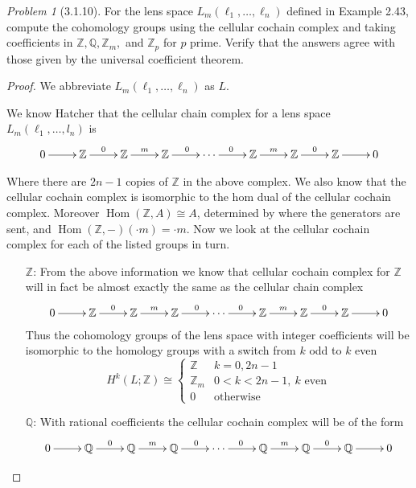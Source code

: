 \documentclass[10pt]{article}
\newcommand{\bb}[1]{\mathbb{#1}}
\DeclareMathOperator{\Hom}{Hom}
\theoremstyle{remark}
\newtheorem{problem}{Problem}
\begin{document}
\begin{problem}[3.1.10]
  For the lens space $L_m(\ell_1,\ldots,\ell_n)$ defined in Example 2.43,
  compute the cohomology groups using the cellular cochain complex
  and taking coefficients in $\bb{Z},\bb{Q},\bb{Z}_m,$ and $\bb{Z}_p$
  for $p$ prime. Verify that the answers agree with those given by the
  universal coefficient theorem.
\end{problem}

\begin{proof}
  We abbreviate $L_m(\ell_1,\ldots,\ell_n)$ as $L$.

  We know Hatcher that the cellular chain complex for a lens space
  $L_m(\ell_1,\ldots,l_n)$ is
  \[
    \xymatrix{
      0 \ar[r] & \bb{Z} \ar[r]^0 & \bb{Z} \ar[r]^m & \bb{Z} \ar[r]^0 & \cdots \ar[r]^0 & \bb{Z} \ar[r]^m & \bb{Z} \ar[r]^0 & \bb{Z} \ar[r] & 0
    }
  \]

  Where there are $2n-1$ copies of $\bb{Z}$ in the above complex.
  We also know that the cellular cochain complex is isomorphic to the hom dual
  of the cellular cochain complex. Moreover $\Hom(\bb{Z},A)\cong A$, determined by
  where the generators are sent, and $\Hom(\bb{Z},-)(\cdot m)=\cdot m$. Now we look
  at the cellular cochain complex for each of the listed groups in turn.

  \begin{itemize}
  \item[$\bb{Z}$:] From the above information we know that cellular cochain
    complex for $\bb{Z}$ will in fact be almost exactly the same as the cellular chain complex
    \[
      \xymatrix{
        0 \ar[r] & \bb{Z} \ar[r]^0 & \bb{Z} \ar[r]^m & \bb{Z} \ar[r]^0 & \cdots \ar[r]^0 & \bb{Z} \ar[r]^m & \bb{Z} \ar[r]^0 & \bb{Z} \ar[r] & 0
      }
    \]
    Thus the cohomology groups of the lens space with integer coefficients
    will be isomorphic to the homology groups with a switch from $k$ odd to $k$ even
    \[
      H^k(L;\bb{Z}) \cong  
      \left\{
        \begin{array}{ll}
          \bb{Z}& k=0,2n-1\\
          \bb{Z}_m& 0<k<2n-1,\ \text{$k$ even}\\
          0 & \text{otherwise}
        \end{array}
      \right.
    \]
  \item[$\bb{Q}$:] With rational coefficients the cellular cochain complex will
    be of the form
    \[
      \xymatrix{
        0 \ar[r] & \bb{Q} \ar[r]^0 & \bb{Q} \ar[r]^m & \bb{Q} \ar[r]^0 & \cdots \ar[r]^0 & \bb{Q} \ar[r]^m & \bb{Q} \ar[r]^0 & \bb{Q} \ar[r] & 0
      }
    \]


\end{itemize}
\end{proof}
\end{document}
